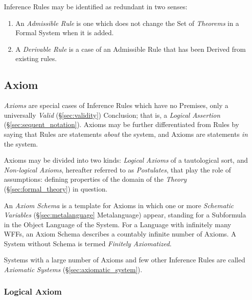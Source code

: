 Inference Rules may be identified as redundant in two senses:
\begin{enumerate}
\item An \emph{Admissible Rule} is one which does not change the Set
  of \emph{Theorems} in a Formal System when it is added.
\item A \emph{Derivable Rule} is a case of an Admissible Rule that has
  been Derived from existing rules.
\end{enumerate}



\subsection{Axiom}\label{sec:axiom}

\emph{Axioms} are special cases of Inference Rules which have no
Premises, only a universally \emph{Valid} (\S\ref{sec:validity})
Conclusion; that is, a \emph{Logical Assertion}
(\S\ref{sec:sequent_notation}). Axioms may be further differentiated
from Rules by saying that Rules are statements \emph{about} the
system, and Axioms are statements \emph{in} the system.

Axioms may be divided into two kinds: \emph{Logical Axioms} of a
tautological sort, and \emph{Non-logical Axioms}, hereafter referred
to as \emph{Postulates}, that play the role of assumptions: defining
properties of the domain of the \emph{Theory}
(\S\ref{sec:formal_theory}) in question.

An \emph{Axiom Schema} is a template for Axioms in which one or more
\emph{Schematic Variables} (\S\ref{sec:metalanguage} Metalanguage)
appear, standing for a Subformula in the Object Language of the
System. For a Language with infinitely many WFFs, an Axiom Schema
describes a countably infinite number of Axioms. A System without
Schema is termed \emph{Finitely Axiomatized}.

Systems with a large number of Axioms and few other Inference Rules
are called \emph{Axiomatic Systems} (\S\ref{sec:axiomatic_system}).



\subsubsection{Logical Axiom}\label{sec:logical_axiom}



